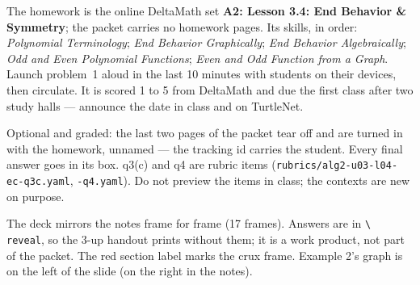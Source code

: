\documentclass[10pt]{article}
\begin{document}
\begin{teachernote}[Homework]
The homework is the online DeltaMath set \textbf{A2: Lesson 3.4: End Behavior \& Symmetry}; the
packet carries no homework pages. Its skills, in order: \emph{Polynomial Terminology}; \emph{End Behavior Graphically}; \emph{End Behavior Algebraically}; \emph{Odd and Even Polynomial Functions}; \emph{Even and Odd Function from a Graph}.
Launch problem~1 aloud in the last 10 minutes with students on their devices, then circulate.
It is scored 1 to 5 from DeltaMath and due the first class after two study halls --- announce
the date in class and on TurtleNet.
\end{teachernote}

\begin{teachernote}
Optional and graded: the last two pages of the packet tear off and are turned in with the
homework, unnamed --- the tracking id carries the student. Every final answer goes in its box.
q3(c) and q4 are rubric items (\texttt{rubrics/alg2-u03-l04-ec-q3c.yaml}, \texttt{-q4.yaml}).
Do not preview the items in class; the contexts are new on purpose.
\end{teachernote}

\begin{teachernote}[Slides]
The deck mirrors the notes frame for frame (17 frames). Answers are in \texttt{\textbackslash
reveal}, so the 3-up handout prints without them; it is a work product, not part of the packet.
The red section label marks the crux frame. Example 2's graph is on the left of the slide (on
the right in the notes).
\end{teachernote}
\end{document}
